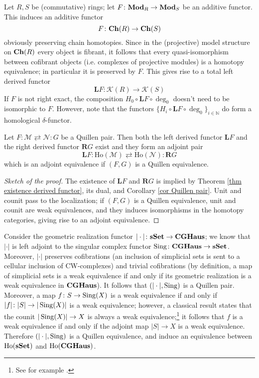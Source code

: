 \begin{refsection}
\begin{eg}
Let $R, S$ be (commutative) rings; let $F \colon \mathbf{Mod}_R \to \mathbf{Mod}_S$ be an additive functor. This induces an additive functor
\[
F \colon \mathbf{Ch}(R) \to \mathbf{Ch}(S)
\]
obviously preserving chain homotopies. Since in the (projective) model structure on $\mathbf{Ch}(R)$ every object is fibrant, it follows that every quasi-isomorphism between cofibrant objects (i.e. complexes of projective modules) is a homotopy equivalence; in particular it is preserved by $F$. This gives rise to a total left derived functor
\[
\mathbf L F \colon \mathcal K(R) \to \mathcal K(S)
\]
If $F$ is not right exact, the composition $H_0 \circ \mathbf L F \circ \deg_0$ doesn't need to be isomorphic to $F$. However, note that the functors $\{H_i \circ \mathbf LF \circ \deg_0\}_{i \in \mathbb N}$ do form a homological $\delta$-functor.
\end{eg}

\begin{thm} \label{thm quillen adjuntion}
Let $F \colon \mathcal M \rightleftarrows \mathcal N \colon G$ be a Quillen pair. Then both the left derived functor $\mathbf L F$ and the right derived functor $\mathbf R G$ exist and they form an adjoint pair
\[
\mathbf L F \colon \mathrm{Ho}(\mathcal M) \rightleftarrows \mathrm{Ho}(\mathcal N) \colon \mathbf R G
\]
which is an adjoint equivalence if $(F,G)$ is a Quillen equivalence.
\end{thm}

\begin{proof}[Sketch of the proof]
The existence of $\mathbf L F$ and $\mathbf R G$ is implied by Theorem \ref{thm existence derived functor}, its dual, and Corollary \ref{cor Quillen pair}. Unit and counit pass to the localization; if $(F,G)$ is a Quillen equivalence, unit and counit are weak equivalences, and they induces isomorphisms in the homotopy categories, giving rise to an adjoint equivalence.
\end{proof}

\begin{eg}
Consider the geometric realization functor $|\cdot| \colon \mathbf{sSet} \to \mathbf{CGHaus}$; we know that $|\cdot|$ is left adjoint to the singular complex functor $\operatorname{\mathrm{Sing}} \colon \mathbf{CGHaus} \to \mathbf{sSet}$. Moreover, $|\cdot|$ preserves cofibrations (an inclusion of simplicial sets is sent to a cellular inclusion of CW-complexes) and trivial cofibrations (by definition, a map of simplicial sets is a weak equivalence if and only if its geometric realization is a weak equivalence in $\mathbf{CGHaus}$). It follows that $(|\cdot|,\operatorname{\mathrm{Sing}})$ is a Quillen pair. Moreover, a map $f \colon S \to \operatorname{\mathrm{Sing}}(X)$ is a weak equivalence if and only if $|f| \colon |S| \to |\operatorname{\mathrm{Sing}}(X)|$ is a weak equivalence; however, a classical result states that the counit $|\operatorname{\mathrm{Sing}}(X)| \to X$ is always a weak equivalence;\footnote{See for example \cite[Theorem 16.6]{may}.} it follows that $f$ is a weak equivalence if and only if the adjoint map $|S| \to X$ is a weak equivalence. Therefore $(|\cdot|,\operatorname{\mathrm{Sing}})$ is a Quillen equivalence, and induce an equivalence between $\mathrm{Ho}(\mathbf{sSet})$ and $\mathrm{Ho}(\mathbf{CGHaus})$.
\end{eg}


\end{refsection}
